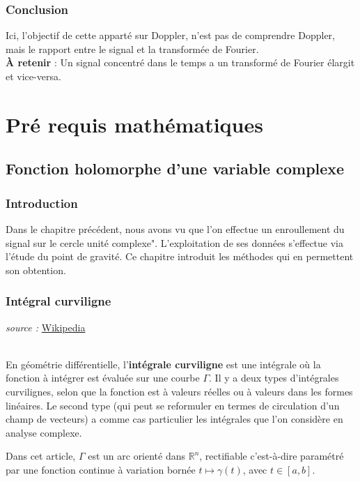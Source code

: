 \documentclass[a4paper]{book}
\begin{document}
\section{Conclusion}

Ici, l'objectif de cette apparté sur Doppler, n'est pas de comprendre Doppler,
mais le rapport entre le signal et la transformée de Fourier.\\
\textbf{À retenir} : Un signal concentré dans le temps a un transformé de 
Fourier élargit et vice-versa.





\part{Pré requis mathématiques}
\chapter{Fonction holomorphe d'une variable complexe}
\section{Introduction}
Dans le chapitre précédent, nous avons vu que l'on effectue un
enroullement du signal sur le cercle unité complexe". L'exploitation de ses
données s'effectue via l'étude du point de gravité. Ce chapitre introduit les
méthodes qui en permettent son obtention.

\section{Intégral curviligne}
\emph{source :} 
\href{https://fr.wikipedia.org/wiki/Int%C3%A9grale_curviligne}{Wikipedia}

\\

En géométrie différentielle, l'\textbf{intégrale curviligne} est une intégrale où la
fonction à intégrer est évaluée sur une courbe $\Gamma$. Il y a deux types d'intégrales
curvilignes, selon que la fonction est à valeurs réelles ou à valeurs dans les
formes linéaires. Le second type (qui peut se reformuler en termes de
circulation d'un champ de vecteurs) a comme cas particulier les intégrales que
l'on considère en analyse complexe.

Dans cet article, $\Gamma$ est un arc orienté dans $\mathbb{R}^n$, rectifiable c'est-à-dire
paramétré par une fonction continue à variation bornée $t \mapsto \gamma(t)$,
avec $t \in [a,b]$. 
\end{document}
